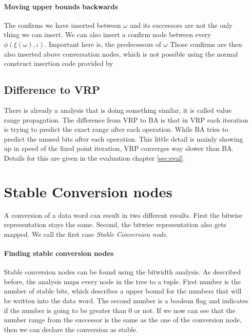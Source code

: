 \paragraph{Moving upper bounds backwards}
The confirms we have inserted between $\omega$ and its successors are not the only thing we can insert. We can also insert a confirm node between every $\phi(\xi(\omega), \iota)$. Important here is, the predecessors of $\omega$
Those confirms are then also inserted above conversation nodes, which is not possible using the normal construct insertion code provided by \libFIRM


\subsection{Difference to VRP}

There is already a analysis that is doing something similar, it is called value range propagation. The difference from VRP to BA is that in VRP each iteration is trying to predict the exact range after each operation. While BA tries to predict the unused bits after each operation. This little detail is mainly showing up in speed of the fixed point iteration, VRP converges way slower than BA. Details for this are given in the evaluation chapter \ref{sec:eval}.

\section{Stable Conversion nodes}
A conversion of a data word can result in two different results. First the bitwise representation stays the same. Second, the bitwise representation also gets mapped.
We call the first case \textit{Stable Conversion node}.

\paragraph{Finding stable conversion nodes}
Stable conversion nodes can be found using the bitwidth analysis. As described before, the analysis maps every node in the tree to a tuple. First number is the number of stable bits, which describes a upper bound for the numbers that will be written into the data word. The second number is a boolean flag and indicates if the number is going to be greater than 0 or not. If we now can see that the number range from the successor is the same as the one of the conversion node, then we can declare the conversion as stable.

